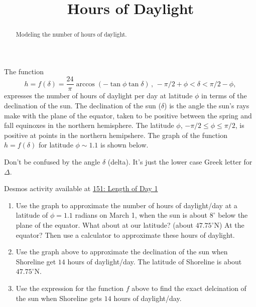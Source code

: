 \documentclass{ximera}
\title{Hours of Daylight}
\begin{document}
\begin{abstract}
Modeling the number of hours of daylight.
\end{abstract}
\maketitle


\begin{question}  \label{Qdf4ppp3455}
The function
\[
    h = f(\delta) = \frac{24}{\pi} \arccos(-\tan\phi \tan\delta) \, , \, -\pi/2+\phi < \delta < \pi/2-\phi ,
\]
expresses the number of hours of daylight per day at latitude $\phi$ in terms of the declination of the sun. The declination of the sun ($\delta$) is the angle the sun's rays make with the plane of the equator, taken to be positive between the spring and fall equinoxes in the northern hemisphere. The latitude $\phi$, $-\pi/2 \leq \phi \leq \pi/2$, is positive at points in the northern hemipshere. The graph of the function $h=f(\delta)$ for latitude $\phi\sim 1.1$ is shown below.

Don't be confused by the angle $\delta$ (delta). It's just the lower case Greek letter for $\Delta$.

\begin{onlineOnly}
    \begin{center}
\end{center}
\end{onlineOnly}

Desmos activity available at \href{https://www.desmos.com/calculator/ifomatkcta}{151: Length of Day 1}

\begin{enumerate}
\item Use the graph to approximate the number of hours of daylight/day at a latitude of $\phi=1.1$ radians on March 1, when the sun is about $8^\circ$ below the plane of the equator. What about at our latitude? (about $47.75^\circ$N) At the equator? Then use a calculator to approximate these hours of daylight.

\item Use the graph above to approximate the declination of the sun when Shoreline get $14$ hours of daylight/day. The latitude of Shoreline is about $47.75^\circ$N.

\item Use the expression for the function $f$ above to find the exact delcination of the sun when Shoreline gets $14$ hours of daylight/day.


\end{enumerate}
\end{question}
\end{document}
